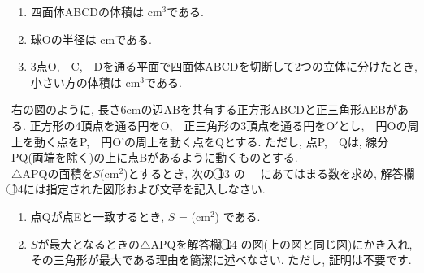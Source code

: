 \documentclass[dvipdfmx, titlepage, 11pt]{jsarticle}
\newcommand{\ncircle}[1]{\textcircled{\scriptsize #1}}
\newcommand{\nbox}[1]{\fbox{\hspace{5pt} \textcircled{\scriptsize #1}\hspace{5pt} }}
\newcommand{\ebox}{\fbox{　\hspace{10pt} }}
\begin{document}
\begin{enumerate}[(1)]
\item 四面体ABCDの体積は \nbox{10} cm${}^{3}$である.
  \newpage
\item 球Oの半径は \nbox{11} cmである.\\[7cm]
\item 3点O,\ \ C,\ \ Dを通る平面で四面体ABCDを切断して2つの立体に分けたとき, 小さい方の体積は \nbox{12} cm${}^{3}$である.
\end{enumerate}
\newpage
\begin{multicols}{2}
  \noindent {}\hspace{10pt} 右の図のように, 長さ6cmの辺ABを共有する正方形ABCDと正三角形AEBがある. 正方形の4頂点を通る円をO,\ \ 正三角形の3頂点を通る円をO$'$とし,\ \ 円Oの周上を動く点をP,\ \ 円O'の周上を動く点をQとする. ただし, 点P,\ \ Qは, 線分PQ(両端を除く)の上に点Bがあるように動くものとする. \\
  $\triangle$APQの面積を$S$(cm${}^{2}$)とするとき, 次の \ncircle{13} の \ebox \ \ にあてはまる数を求め, 解答欄 \ncircle{14}には指定された図形および文章を記入しなさい.
  \begin{center}
  \end{center}
\end{multicols}
\begin{enumerate}[(1)]
\item 点Qが点Eと一致するとき, $S$ = \nbox{13} (cm${}^{2}$) である.\\[5cm]
\item $S$が最大となるときの$\triangle$APQを解答欄 \ncircle{14} の図(上の図と同じ図)にかき入れ, その三角形が最大である理由を簡潔に述べなさい. ただし, 証明は不要です.
\end{enumerate}
\newpage
\thispagestyle{empty}
　
\newpage
\newpage
\thispagestyle{empty}
　
\newpage
\end{document}
